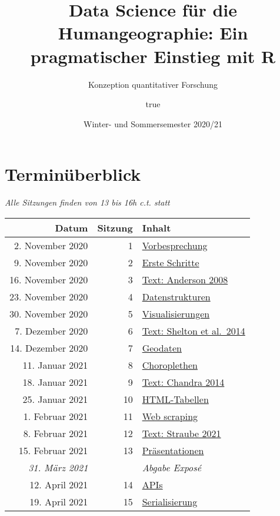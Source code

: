 \documentclass[
  ngerman,
]{article}
\title{Data Science für die Humangeographie: Ein pragmatischer Einstieg mit R}
\subtitle{Konzeption quantitativer Forschung}
\author{true}
\date{Winter- und Sommersemester 2020/21}
\begin{document}
\maketitle

{
\setcounter{tocdepth}{2}
\tableofcontents
}
\hypertarget{terminuxfcberblick}{%
\section*{Terminüberblick}\label{terminuxfcberblick}}

\emph{Alle Sitzungen finden von 13 bis 16h c.t. statt}

\begin{longtable}[]{@{}rrl@{}}
\toprule
Datum & Sitzung & Inhalt \\
\midrule
\endhead
2. November 2020 & 1 & \protect\hyperlink{vorbesprechung}{Vorbesprechung} \\
9. November 2020 & 2 & \protect\hyperlink{erste-schritte}{Erste Schritte} \\
16. November 2020 & 3 & \protect\hyperlink{text-anderson-2008}{Text: Anderson 2008} \\
23. November 2020 & 4 & \protect\hyperlink{datenstrukturen}{Datenstrukturen} \\
30. November 2020 & 5 & \protect\hyperlink{visualisierungen}{Visualisierungen} \\
7. Dezember 2020 & 6 & \protect\hyperlink{text-shelton-et-al.-2014}{Text: Shelton et al.~2014} \\
14. Dezember 2020 & 7 & \protect\hyperlink{geodaten}{Geodaten} \\
11. Januar 2021 & 8 & \protect\hyperlink{choroplethen}{Choroplethen} \\
18. Januar 2021 & 9 & \protect\hyperlink{text-chandra-2014}{Text: Chandra 2014} \\
25. Januar 2021 & 10 & \protect\hyperlink{html-tabellen}{HTML-Tabellen} \\
1. Februar 2021 & 11 & \protect\hyperlink{web-scraping}{Web scraping} \\
8. Februar 2021 & 12 & \protect\hyperlink{text-straube-2021}{Text: Straube 2021} \\
15. Februar 2021 & 13 & \protect\hyperlink{pruxe4sentationen}{Präsentationen} \\
\emph{31. März 2021} & & \emph{Abgabe Exposé} \\
12. April 2021 & 14 & \protect\hyperlink{apis}{APIs} \\
19. April 2021 & 15 & \protect\hyperlink{serialisierung}{Serialisierung} \\

\end{longtable}
\end{document}
